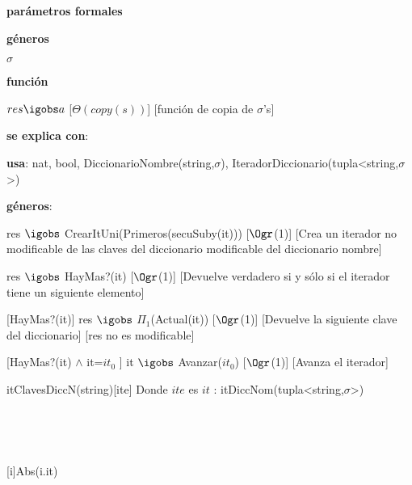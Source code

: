 \begin{Interfaz}

		\textbf{parámetros formales}\parindent\\
	\parbox{1.7cm}{\textbf{géneros}} $\sigma$\\
	\parbox[t]{1.7cm}{\textbf{función}}\parbox[t]{\textwidth-2\parindent-1.7cm}{%
	    	{$res \igobs a$}
		[$\Theta(copy(s))$]
		[función de copia de $\sigma$'s]
	}
	
	\textbf{se explica con}: 
	
	\textbf{usa}: nat, bool, DiccionarioNombre(string,$\sigma$), IteradorDiccionario(tupla<string,$\sigma$>)
	
	\textbf{géneros}: 
	

	{res $\igobs$ CrearItUni(Primeros(secuSuby(it)))}
	[$\Ogr$(1)]
	[Crea un iterador no modificable de las claves del diccionario modificable del diccionario nombre]
	
	
	{res $\igobs$ HayMas?(it)}
	[$\Ogr$(1)]
	[Devuelve verdadero si y sólo si el iterador tiene un siguiente elemento]
	
	[HayMas?(it)]
	{res $\igobs$ $\Pi_1$(Actual(it))}
	[$\Ogr$(1)]
	[Devuelve la siguiente clave del diccionario]
	[res no es modificable]
	
	[HayMas?(it) $\land$ it=$it_0$ ]
	{it $\igobs$ Avanzar($it_0$)}
	[$\Ogr$(1)]
	[Avanza el iterador]
	
	
\end{Interfaz}

\begin{Representacion}

	\begin{Estructura}{itClavesDiccN(string)}[ite]
		Donde $ite$ es $it$ : itDiccNom(tupla<string,$\sigma$>)
	\end{Estructura}
	
~
	
	
~

	{Abs(i.it)}
	

\end{Representacion}

